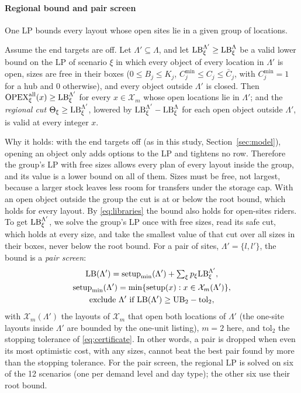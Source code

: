 \paragraph*{Regional bound and pair screen}
One LP bounds every layout whose open sites lie in a given group of locations.
\begin{proposition}\label{prop:regional}
Assume the end targets are off. Let $\Lambda'\subseteq\Lambda$, and let $\mathrm{LB}^{\Lambda'}_\xi\ge\mathrm{LB}^\Lambda_\xi$ be a valid lower bound on the LP of scenario $\xi$ in which every object of every location in $\Lambda'$ is open, sizes are free in their boxes ($0\le B_j\le K_j$, $C^{\min}_j\le C_j\le\bar C_j$, with $C^{\min}_j=1$ for a hub and 0 otherwise), and every object outside $\Lambda'$ is closed. Then $\mathrm{OPEX}^{\mathrm{all}}_\xi(x)\ge\mathrm{LB}^{\Lambda'}_\xi$ for every $x\in\mathcal X_m$ whose open locations lie in $\Lambda'$; and the \emph{regional cut} $\Theta_\xi\ge\mathrm{LB}^{\Lambda'}_\xi$, lowered by $\mathrm{LB}^{\Lambda'}_\xi-\mathrm{LB}^{\Lambda}_\xi$ for each open object outside $\Lambda'$, is valid at every integer $x$.
\end{proposition}
Why it holds: with the end targets off (as in this study, Section~\ref{sec:model}), opening an object only adds options to the LP and tightens no row. Therefore the group's LP with free sizes allows every plan of every layout inside the group, and its value is a lower bound on all of them. Sizes must be free, not largest, because a larger stock leaves less room for transfers under the storage cap. With an open object outside the group the cut is at or below the root bound, which holds for every layout. By \eqref{eq:libraries} the bound also holds for open-sites riders. To get $\mathrm{LB}^{\Lambda'}_\xi$, we solve the group's LP once with free sizes, read its safe cut, which holds at every size, and take the smallest value of that cut over all sizes in their boxes, never below the root bound. For a pair of sites, $\Lambda'=\{l,l'\}$, the bound is a \emph{pair screen}:
\begin{equation}\label{eq:pairscreen}
  \begin{gathered}
  \LB(\Lambda')=\mathrm{setup}_{\min}(\Lambda')+\textstyle\sum_{\xi}p_\xi\LB^{\Lambda'}_\xi,\\
  \mathrm{setup}_{\min}(\Lambda')=\min\{\mathrm{setup}(x):x\in\mathcal X_m(\Lambda')\},\\
  \text{exclude }\Lambda'\ \text{if}\ \LB(\Lambda')\ge\UB_2-\mathrm{tol}_2 ,
  \end{gathered}
\end{equation}
with $\mathcal X_m(\Lambda')$ the layouts of $\mathcal X_m$ that open both locations of $\Lambda'$ (the one-site layouts inside $\Lambda'$ are bounded by the one-unit listing), $m=2$ here, and $\mathrm{tol}_2$ the stopping tolerance of \eqref{eq:certificate}. In other words, a pair is dropped when even its most optimistic cost, with any sizes, cannot beat the best pair found by more than the stopping tolerance. For the pair screen, the regional LP is solved on six of the 12 scenarios (one per demand level and day type); the other six use their root bound.

